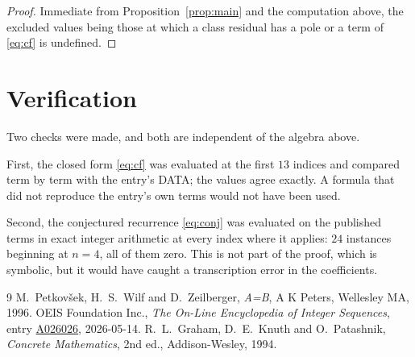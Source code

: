 \documentclass[11pt,a4paper]{article}
\theoremstyle{plain}
\theoremstyle{definition}
\begin{document}
\begin{proof}
Immediate from Proposition~\ref{prop:main} and the computation above, the excluded values
being those at which a class residual has a pole or a term of \eqref{eq:cf} is undefined.
\end{proof}

\section{Verification}

Two checks were made, and both are independent of the algebra above.

First, the closed form \eqref{eq:cf} was evaluated at the first $13$ indices and
compared term by term with the entry's DATA; the values agree exactly. A formula that did
not reproduce the entry's own terms would not have been used.

Second, the conjectured recurrence \eqref{eq:conj} was evaluated on the published terms in
exact integer arithmetic at every index where it applies: $24$ instances beginning at
$n=4$, all of them zero. This is not part of the proof, which is symbolic, but it
would have caught a transcription error in the coefficients.

\begin{thebibliography}{9}
 M.~Petkov\v{s}ek, H.~S.~Wilf and D.~Zeilberger, \emph{A=B}, A K Peters,
Wellesley MA, 1996.
 OEIS Foundation Inc., \emph{The On-Line Encyclopedia of Integer Sequences},
entry \href{https://oeis.org/A026026}{A026026}, 2026-05-14.
 R.~L.~Graham, D.~E.~Knuth and O.~Patashnik, \emph{Concrete Mathematics},
2nd ed., Addison-Wesley, 1994.
\end{thebibliography}
\end{document}
